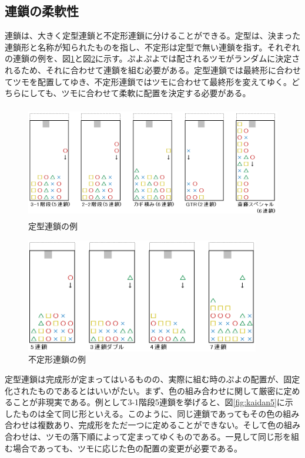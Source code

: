 \documentclass[12pt]{jsarticle}
\begin{document}
\subsection{連鎖の柔軟性}
連鎖は、大きく定型連鎖と不定形連鎖に分けることができる。定型は、決まった連鎖形と名称が知られたものを指し、不定形は定型で無い連鎖を指す。それぞれの連鎖の例を、図\ref{fig:teikei}と図\ref{fig:huteikei}に示す。ぷよぷよでは配されるツモがランダムに決定されるため、それに合わせて連鎖を組む必要がある。定型連鎖では最終形に合わせてツモを配置してゆき、不定形連鎖ではツモに合わせて最終形を変えてゆく。どちらにしても、ツモに合わせて柔軟に配置を決定する必要がある。

\begin{figure}[hbt]
  \begin{center}
  \includegraphics[height=5cm]{img/teikei.png}
  \caption{定型連鎖の例} \label{fig:teikei}
\end{center}
\end{figure}

\begin{figure}[hbt]
  \begin{center}
  \includegraphics[height=5cm]{img/huteikei.png}
  \caption{不定形連鎖の例} \label{fig:huteikei}
\end{center}
\end{figure}

定型連鎖は完成形が定まってはいるものの、実際に組む時のぷよの配置が、固定化されたものであるとはいいがたい。まず、色の組み合わせに関して厳密に定めることが非現実である。例として3-1階段5連鎖を挙げると、図\ref{fig:kaidan5}に示したものは全て同じ形といえる。このように、同じ連鎖であってもその色の組み合わせは複数あり、完成形をただ一つに定めることができない。そして色の組み合わせは、ツモの落下順によって定まってゆくものである。一見して同じ形を組む場合であっても、ツモに応じた色の配置の変更が必要である。
\end{document}
